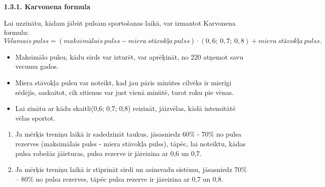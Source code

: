 \documentclass[12pt]{article}
\begin{document}
\begin{center}
\fontsize{14}{}\selectfont\textbf{1.3.1. Karvonena formula}
\end{center}

Lai uzzinātu, kādam jābūt pulsam sportošanas laikā, var izmantot Karvonena formulu: 
$$Vēlamais\ pulss = (maksimālais\ pulss  - miera\ stāvokļa\ pulss) \cdot (0,6;\ 0,7;\ 0,8) + miera\ stāvokļa\ pulss.$$
\begin{itemize}
    \item Maksimālo pulsu, kādu sirds var izturēt, var aprēķināt, no 220 atņemot savu vecumu gados. 
    \item 	Miera stāvokļa pulsu var noteikt, kad jau pāris minūtes cilvēks ir mierīgi sēdējis, saskaitot, cik sitienus var just vienā minūtē, turot roku pie vēnas.
    \item Lai zinātu ar kādu skaitli(0,6; 0,7; 0,8) reizināt, jāizvēlas, kādā intensitātē vēlas sportot.
\end{itemize}
	\begin{enumerate}
	    \item Ja mērķis treniņu laikā ir sadedzināt taukus, jāsasniedz 60\% - 70\% no pulsa rezerves (maksimālais pulss - miera stāvokļa pulss), tāpēc, lai noteiktu, kādas pulsa robežās jāieturas, pulsa rezerve ir jāreizina ar 0,6 un 0,7.
	    \item Ja mērķis treniņu laikā ir stiprināt sirdi un asinsvadu sistēmu, jāsasniedz 70\% – 80\% no pulsa rezerves, tāpēc pulsa rezerve ir jāreizina ar 0,7 un 0,8.
	\end{enumerate}
	
\end{document}
